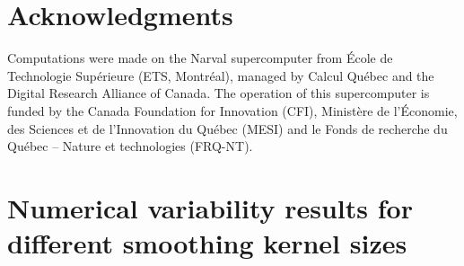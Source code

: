 \documentclass[lettersize,journal]{IEEEtran}
\begin{document}
\section{Acknowledgments}

Computations were made on the Narval supercomputer from \'Ecole de Technologie
Sup\'erieure (ETS, Montr\'eal), managed by Calcul Québec and the Digital Research Alliance of Canada. The
operation of this supercomputer is funded by the Canada Foundation for
Innovation (CFI), Ministère de l’Économie, des Sciences et de l’Innovation du
Québec (MESI) and le Fonds de recherche du Québec – Nature et technologies
(FRQ-NT).




\appendix

\section*{Numerical variability results for different smoothing kernel sizes}
\label{appendix:numerical_uncertainty}

\end{document}
